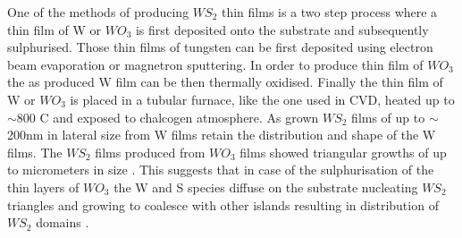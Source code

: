 One of the methods of producing $WS_2$ thin films is a two step process where a thin film of W or $WO_3$ is first deposited onto the substrate and subsequently sulphurised. Those thin films of tungsten can be first deposited using electron beam evaporation or magnetron sputtering. In order to produce thin film of $WO_3$ the as produced W film can be then thermally oxidised. Finally the thin film of W or $WO_3$ is placed in a tubular furnace, like the one used in CVD, heated up to $\sim$800 {\degree}C and exposed to chalcogen atmosphere. As grown $WS_2$ films of up to $\sim$200nm in lateral size from W films retain the distribution and shape of the W films. The $WS_2$ films produced from $WO_3$ films showed triangular growths of up to micrometers in size . This suggests that in case of the sulphurisation of the thin layers of $WO_3$ the W and S species diffuse on the substrate nucleating $WS_2$ triangles and growing to coalesce with other islands resulting in distribution of $WS_2$ domains \cite{doi:10.1021/nn400971k}\cite{Reale2016}.

